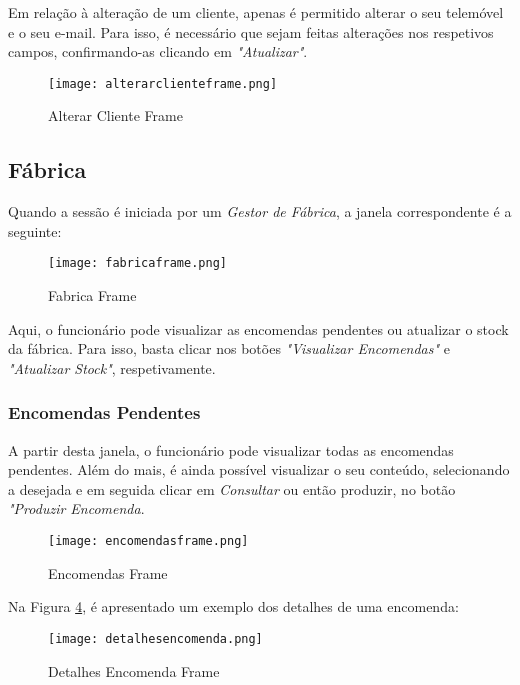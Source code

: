 \label{alterarcliente}

Em relação à alteração de um cliente, apenas é permitido alterar o seu telemóvel e o seu e-mail. Para isso, é necessário que sejam feitas alterações nos respetivos campos, confirmando-as clicando em \textit{"Atualizar"}.

\begin{figure}[H]
	\centering
	\texttt{[image: alterarclienteframe.png]}
	\caption{Alterar Cliente Frame}
	\label{alterarclienteframe}
\end{figure}


\subsection{Fábrica}
\label{fabricasec}

Quando a sessão é iniciada por um \textit{Gestor de Fábrica}, a janela correspondente é a seguinte:

\begin{figure}[H]
	\centering
	\texttt{[image: fabricaframe.png]}
	\caption{Fabrica Frame}
	\label{fabricaframe}
\end{figure}

Aqui, o funcionário pode visualizar as encomendas pendentes ou atualizar o stock da fábrica. Para isso, basta clicar nos botões \textit{"Visualizar Encomendas"} e \textit{"Atualizar Stock"}, respetivamente.

\subsubsection{Encomendas Pendentes}
A partir desta janela, o funcionário pode visualizar todas as encomendas pendentes. Além do mais, é ainda possível visualizar o seu conteúdo, selecionando a desejada e em seguida clicar em \textit{Consultar} ou então produzir, no botão \textit{"Produzir Encomenda}.

\begin{figure}[H]
	\centering
	\texttt{[image: encomendasframe.png]}
	\caption{Encomendas Frame}
	\label{encomendasframe}
\end{figure}



Na Figura \ref{dencomendasframe}, é apresentado um exemplo dos detalhes de uma encomenda:

\begin{figure}[H]
	\centering
	\texttt{[image: detalhesencomenda.png]}
	\caption{Detalhes Encomenda Frame}
	\label{dencomendasframe}
\end{figure}

